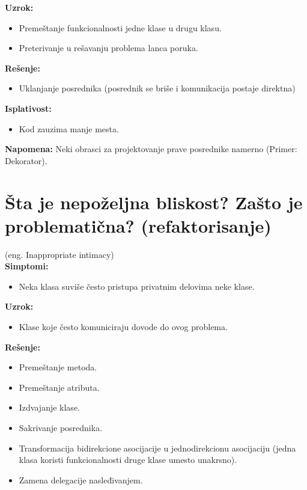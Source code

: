 \documentclass[a4paper]{article}
\begin{document}
  \noindent \textbf{Uzrok:} 
  \begin{itemize}
    \item Premeštanje funkcionalnosti jedne klase u drugu klasu.
    \item Preterivanje u rešavanju problema lanca poruka.
  \end{itemize}

  \noindent \textbf{Rešenje:} 
  \begin{itemize}
    \item Uklanjanje posrednika (posrednik se briše i komunikacija postaje direktna)
  \end{itemize}

  \noindent \textbf{Isplativost:} 
  \begin{itemize}
    \item Kod zauzima manje mesta.
  \end{itemize}  
  \textbf{Napomena:} Neki obrasci za projektovanje prave posrednike namerno (Primer: Dekorator).

\section{Šta je nepoželjna bliskost? Zašto je problematična? (refaktorisanje)}
  (eng. Inappropriate intimacy)\\
  \textbf{Simptomi:}
  \begin{itemize}
    \item Neka klasa suviše često pristupa privatnim delovima neke klase.
  \end{itemize}

  \noindent \textbf{Uzrok:} 
  \begin{itemize}
    \item Klase koje često komuniciraju dovode do ovog problema.
  \end{itemize}

  \noindent \textbf{Rešenje:} 
  \begin{itemize}
    \item Premeštanje metoda.
    \item Premeštanje atributa.
    \item Izdvajanje klase.
    \item Sakrivanje posrednika.
    \item Transformacija bidirekcione asocijacije u jednodirekcionu asocijaciju (jedna
          klasa koristi funkcionalnosti druge klase umesto unakrsno).
    \item Zamena delegacije nasleđivanjem.
  \end{itemize}
\end{document}
